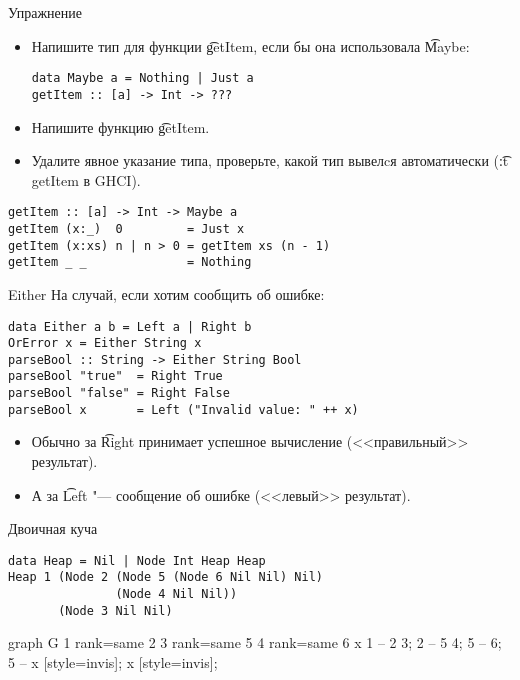 \begin{frame}[t,fragile]{Упражнение}
	\begin{itemize}
		\item Напишите тип для функции \t{getItem}, если бы она использовала \t{Maybe}:
\begin{verbatim}
data Maybe a = Nothing | Just a
getItem :: [a] -> Int -> ???
\end{verbatim}
		\item Напишите функцию \t{getItem}.
		\item Удалите явное указание типа, проверьте, какой тип вывелcя автоматически (\t{:t getItem} в GHCI).
	\end{itemize}
	\pause
\begin{verbatim}
getItem :: [a] -> Int -> Maybe a
getItem (x:_)  0         = Just x
getItem (x:xs) n | n > 0 = getItem xs (n - 1)
getItem _ _              = Nothing
\end{verbatim}
\end{frame}

\begin{frame}[fragile]{Either}
	На случай, если хотим сообщить об ошибке:
\begin{verbatim}
data Either a b = Left a | Right b
OrError x = Either String x
parseBool :: String -> Either String Bool
parseBool "true"  = Right True
parseBool "false" = Right False
parseBool x       = Left ("Invalid value: " ++ x)
\end{verbatim}
	\begin{itemize}
		\item Обычно за \t{Right} принимает успешное вычисление (<<правильный>> результат).
		\item А за \t{Left} "--- сообщение об ошибке (<<левый>> результат).
	\end{itemize}
\end{frame}

\begin{frame}[fragile]{Двоичная куча}
\begin{verbatim}
data Heap = Nil | Node Int Heap Heap
Heap 1 (Node 2 (Node 5 (Node 6 Nil Nil) Nil)
               (Node 4 Nil Nil))
       (Node 3 Nil Nil)
\end{verbatim}
	\begin{center}
		\begin{dot2tex}[scale=0.5,options=-tmath]
			graph G {
			    1 {rank=same 2 3} {rank=same 5 4} { rank=same 6 x }
			    1 -- {2 3};
			    2 -- {5 4};
			    5 -- 6;
			    5 -- x [style=invis];
			    x [style=invis];
			}
		\end{dot2tex}
	\end{center}
\end{frame}

